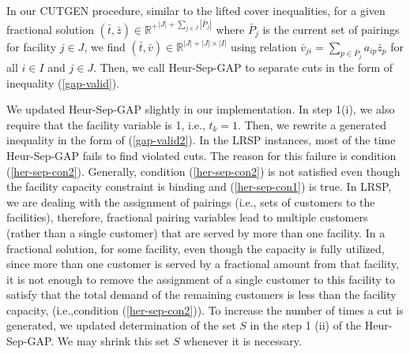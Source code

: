 In our CUTGEN procedure, similar to the lifted cover inequalities,
for a given fractional solution
$(\bar{t},\bar{z}) \in {\mathbb{R}^{+}}^{|J|+\sum_{j \in J}|\bar{P}_{j}|}$
where $\bar{P}_{j}$ is the current set of pairings for facility $j \in J$, we
find $(\bar{t},\bar{v}) \in \mathbb{R}^{|J|+|J|\times|I|}$ using relation
$\bar{v}_{ji} = \sum_{p \in \bar{P}_j}a_{ip}\bar{z}_{p}$ for all $i \in I$ and
$j \in J$. Then, we call
Heur-Sep-GAP to separate cuts in the form of inequality (\ref{gap-valid}).

We updated Heur-Sep-GAP slightly in our implementation.
In step 1(i), we also require that the facility variable is 1, i.e.,
$t_k = 1$. Then, we rewrite a generated inequality in the form of
(\ref{gap-valid2}). In the LRSP instances, most of the time Heur-Sep-GAP
fails to find violated cuts. The reason for this failure is condition
(\ref{her-sep-con2}). Generally, condition (\ref{her-sep-con2}) is not
satisfied even though the facility capacity constraint is binding and
(\ref{her-sep-con1}) is true. In LRSP, we are dealing with the assignment
of pairings (i.e., sets of customers to the facilities), therefore,
fractional pairing variables lead to multiple customers (rather than a single
customer) that are served by
more than one facility. In a fractional solution, for some facility,
even though the capacity is fully utilized, since more than one customer
is served by a fractional amount from that facility, it is not enough to
remove the assignment of a single customer to this facility to satisfy that
the total demand of the remaining customers is less than the facility capacity,
(i.e.,condition (\ref{her-sep-con2})). To increase the number of times a cut is
generated, we updated determination of the set $S$ in the step 1 (ii) of the
Heur-Sep-GAP. We may shrink this set $S$ whenever it is necessary.

